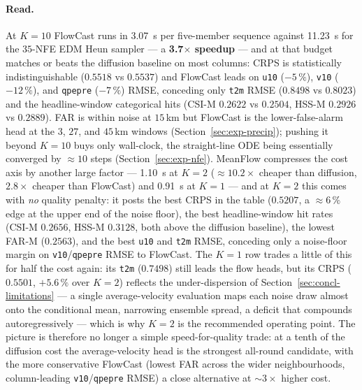 \paragraph{Read.} At $K = 10$ FlowCast runs in \SI{3.07}{\second} per five-member sequence against \SI{11.23}{\second} for the $35$-NFE EDM Heun sampler --- a \textbf{3.7$\times$ speedup} --- and at that budget matches or beats the diffusion baseline on most columns: CRPS is statistically indistinguishable ($0.5518$ vs $0.5537$) and FlowCast leads on \texttt{u10} ($-5\,\%$), \texttt{v10} ($-12\,\%$), and \texttt{qpepre} ($-7\,\%$) RMSE, conceding only \texttt{t2m} RMSE ($0.8498$ vs $0.8023$) and the headline-window categorical hits (CSI-M $0.2622$ vs $0.2504$, HSS-M $0.2926$ vs $0.2889$). FAR is within noise at $15$\,km but FlowCast is the lower-false-alarm head at the $3$, $27$, and $45$\,km windows (Section~\ref{sec:exp-precip}); pushing it beyond $K = 10$ buys only wall-clock, the straight-line ODE being essentially converged by $\approx 10$ steps (Section~\ref{sec:exp-nfe}). MeanFlow compresses the cost axis by another large factor --- \SI{1.10}{\second} at $K = 2$ ($\approx 10.2\times$ cheaper than diffusion, $2.8\times$ cheaper than FlowCast) and \SI{0.91}{\second} at $K = 1$ --- and at $K = 2$ this comes with \emph{no} quality penalty: it posts the best CRPS in the table ($0.5207$, a $\approx 6\,\%$ edge at the upper end of the noise floor), the best headline-window hit rates (CSI-M $0.2656$, HSS-M $0.3128$, both above the diffusion baseline), the lowest FAR-M ($0.2563$), and the best \texttt{u10} and \texttt{t2m} RMSE, conceding only a noise-floor margin on \texttt{v10}/\texttt{qpepre} RMSE to FlowCast. The $K = 1$ row trades a little of this for half the cost again: its \texttt{t2m} ($0.7498$) still leads the flow heads, but its CRPS ($0.5501$, $+5.6\,\%$ over $K = 2$) reflects the under-dispersion of Section~\ref{sec:concl-limitations} --- a single average-velocity evaluation maps each noise draw almost onto the conditional mean, narrowing ensemble spread, a deficit that compounds autoregressively --- which is why $K = 2$ is the recommended operating point. The picture is therefore no longer a simple speed-for-quality trade: at a tenth of the diffusion cost the average-velocity head is the strongest all-round candidate, with the more conservative FlowCast (lowest FAR across the wider neighbourhoods, column-leading \texttt{v10}/\texttt{qpepre} RMSE) a close alternative at $\sim$$3\times$ higher cost.

